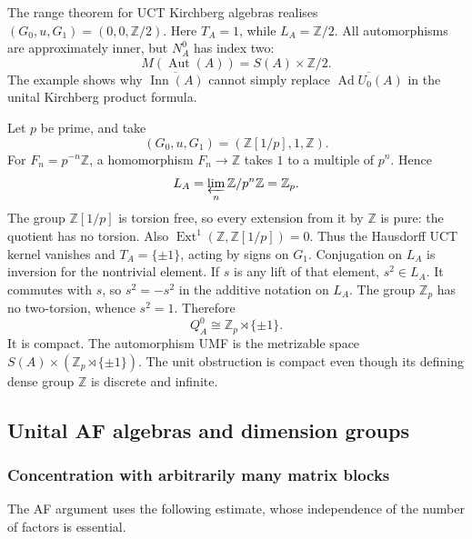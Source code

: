 \begin{example}\label{ex:un-two-components}
The range theorem for UCT Kirchberg algebras \cite[Theorem~4.2.5(1)]{Phillips2000} realises
\((G_0,u,G_1)=(0,0,\mathbb Z/2)\). Here \(T_A=1\), while \(L_A=\mathbb Z/2\).
All automorphisms are approximately inner, but \(N_A^0\) has index two:
\[
 M(\operatorname{Aut}(A))=S(A)\times\mathbb Z/2.
\]
The example shows why \(\overline{\operatorname{Inn}(A)}\) cannot simply replace
\(\overline{\operatorname{Ad} U_0(A)}\) in the unital Kirchberg product formula.
\end{example}

\begin{example}\label{ex:un-profinite}
Let \(p\) be prime, and take
\[
 (G_0,u,G_1)=(\mathbb Z[1/p],1,\mathbb Z).
\]
For \(F_n=p^{-n}\mathbb Z\), a homomorphism \(F_n\to\mathbb Z\) takes \(1\)
to a multiple of \(p^n\). Hence
\[
 L_A=\varprojlim_n\mathbb Z/p^n\mathbb Z=\mathbb Z_p.
\]
The group \(\mathbb Z[1/p]\) is torsion free, so every extension from it
by \(\mathbb Z\) is pure: the quotient has no torsion.
Also \(\operatorname{Ext}^1(\mathbb Z,\mathbb Z[1/p])=0\).
Thus the Hausdorff UCT kernel vanishes and \(T_A=\{\pm1\}\),
acting by signs on \(G_1\).
Conjugation on \(L_A\) is inversion for the nontrivial element.
If \(s\) is any lift of that element, \(s^2\in L_A\).
It commutes with \(s\), so \(s^2=-s^2\) in the additive notation
on \(L_A\). The group \(\mathbb Z_p\) has no two-torsion, whence \(s^2=1\).
Therefore
\[
 Q_A^0\cong\mathbb Z_p\rtimes\{\pm1\}.
\]
It is compact. The automorphism UMF is the metrizable space
\(S(A)\times(\mathbb Z_p\rtimes\{\pm1\})\). The unit obstruction is compact even though its defining dense group \(\mathbb Z\) is discrete and infinite.
\end{example}


\subsection{Unital AF algebras and dimension groups}\label{sec:un-af}


\subsubsection{Concentration with arbitrarily many matrix blocks}
The AF argument uses the following estimate, whose independence of the
number of factors is essential.

